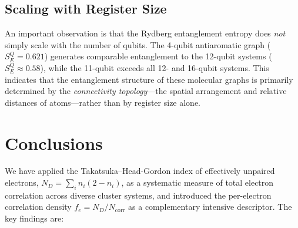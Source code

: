 \documentclass[12pt,a4paper]{article}
\begin{document}
\subsection{Scaling with Register Size}

An important observation is that the Rydberg entanglement entropy does \emph{not}
simply scale with the number of qubits. The 4-qubit  antiaromatic
graph ($S_E^Q = 0.621$) generates comparable entanglement to the 12-qubit
 systems ($S_E^Q \approx 0.58$), while the 11-qubit 
exceeds all 12- and 16-qubit systems. This indicates that the entanglement
structure of these molecular graphs is primarily determined by the
\emph{connectivity topology}---the spatial arrangement and relative distances
of atoms---rather than by register size alone.

\section{Conclusions}

We have applied the Takatsuka--Head-Gordon index of effectively unpaired
electrons, $N_D = \sum_i n_i(2-n_i)$,\cite{takatsuka1978,headgordon2003}
as a systematic measure of total electron correlation across diverse cluster
systems, and introduced the per-electron correlation density
$f_e = N_D/N_{\text{corr}}$ as a complementary intensive descriptor.
The key findings are:
\end{document}
